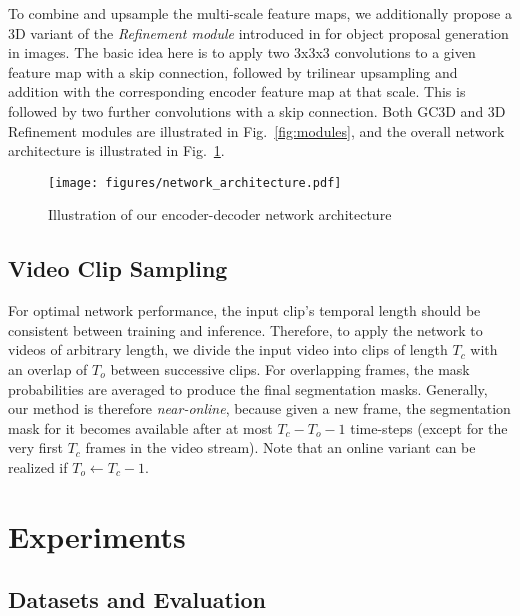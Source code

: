 \documentclass{bmvc2k}
\begin{document}
To combine and upsample the multi-scale feature maps, we additionally propose a 3D variant of the \textit{Refinement module} introduced in \cite{Pinheiro16ECCV} for object proposal generation in images. The basic idea here is to apply two 3x3x3 convolutions to a given feature map with a skip connection, followed by trilinear upsampling and addition with the corresponding encoder feature map at that scale. This is followed by two further convolutions with a skip connection. Both GC3D and 3D Refinement modules are illustrated in Fig.~\ref{fig:modules}, and the overall network architecture is illustrated in Fig.~\ref{fig:network_architecture}.

\begin{figure}
    \centering
    \texttt{[image: figures/network\_architecture.pdf]}
    \caption{Illustration of our encoder-decoder network architecture}
    \label{fig:network_architecture}
\end{figure}

\subsection{Video Clip Sampling}
\label{sec:clip_sampling}

For optimal network performance, the input clip's temporal length should be consistent between training and inference. Therefore, to apply the network to videos of arbitrary length, we divide the input video into clips of length $T_c$ with an overlap of $T_o$ between successive clips. For overlapping frames, the mask probabilities are averaged to produce the final segmentation masks. Generally, our method is therefore \textit{near-online}, because given a new frame, the segmentation mask for it becomes available after at most $T_c-T_o-1$ time-steps (except for the very first $T_c$ frames in the video stream). Note that an online variant can be realized if $T_o \gets T_c-1$.



 
\section{Experiments}
\label{sec:experiments}

\subsection{Datasets and Evaluation}
\end{document}
